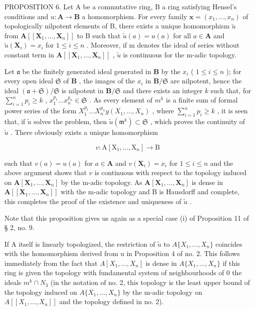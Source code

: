 PROPOSITION 6. Let A be a commutative ring, B a ring satisfying Hensel's conditions and \(u: \mathbf{A} \to \mathbf{B}\) a homomorphism. For every family \(\mathbf{x} = (x_1, \ldots, x_n)\) of topologically nilpotent elements of B, there exists a unique homomorphism \(\tilde{u}\) from \(\mathbf{A}[[\mathbf{X}_1, \ldots, \mathbf{X}_n]]\) to B such that \(\tilde{u}(a) = u(a)\) for all \(a \in \mathbf{A}\) and \(\tilde{u}(\mathbf{X}_i) = x_i\) for \(1 \leqslant i \leqslant n\) . Moreover, if m denotes the ideal of series without constant term in \(\mathbf{A}[[\mathbf{X}_1, \ldots, \mathbf{X}_n]]\) , \(\tilde{u}\) is continuous for the m-adic topology.

Let \(\mathfrak{a}\) be the finitely generated ideal generated in \(\mathbf{B}\) by the \(x_{i}\) ( \(1 \leqslant i \leqslant n\) ); for every open ideal \(\mathfrak{S}\) of \(\mathbf{B}\) , the images of the \(x_{i}\) in \(\mathbf{B}/\mathfrak{S}\) are nilpotent, hence the ideal \((\mathfrak{a} + \mathfrak{S})/\mathfrak{S}\) is nilpotent in \(\mathbf{B}/\mathfrak{S}\) and there exists an integer \(k\) such that, for \(\sum_{i=1}^{n} p_{i} \geqslant k\) , \(x_{1}^{p_{1}} \ldots x_{n}^{p_{n}} \in \mathfrak{S}\) . As every element of \(m^{k}\) is a finite sum of formal power series of the form \(X_{1}^{p_{1}} \ldots X_{n}^{p_{n}} g(X_{1}, \ldots, X_{n})\) , where \(\sum_{i=1}^{n} p_{i} \geqslant k\) , it is seen that, if \(\tilde{u}\) solves the problem, then \(\tilde{u}(\mathfrak{m}^k) \subset \mathfrak{S}\) , which proves the continuity of \(\tilde{u}\) . There obviously exists a unique homomorphism

\[
v \colon \mathrm{A} [ \mathrm{X} _ {1}, \dots , \mathrm{X} _ {n} ] \rightarrow \mathrm{B}
\]

such that \(v(a) = u(a)\) for \(a \in \mathbf{A}\) and \(v(\mathbf{X}_i) = x_i\) for \(1 \leqslant i \leqslant n\) and the above argument shows that \(v\) is continuous with respect to the topology induced on \(\mathbf{A}[\mathbf{X}_1, \ldots, \mathbf{X}_n]\) by the m-adic topology. As \(\mathbf{A}[\mathbf{X}_1, \ldots, \mathbf{X}_n]\) is dense in \(\mathbf{A}[[\mathbf{X}_1, \ldots, \mathbf{X}_n]]\) with the m-adic topology and B is Hausdorff and complete, this completes the proof of the existence and uniqueness of \(\tilde{u}\) .

Note that this proposition gives us again as a special case (i) of Proposition 11 of § 2, no. 9.

If A itself is linearly topologized, the restriction of \(\tilde{u}\) to \(A\{X_{1},\ldots,X_{n}\}\) coincides with the homomorphism derived from u in Proposition 4 of no. 2. This follows immediately from the fact that \(A[X_{1},\ldots,X_{n}]\) is dense in \(A\{X_{1},\ldots,X_{n}\}\) if this ring is given the topology with fundamental system of neighbourhoods of 0 the ideals \(m^{k}\cap N_{3}\) (in the notation of no. 2, this topology is the least upper bound of the topology induced on \(A\{X_{1},\ldots,X_{n}\}\) by the m-adic topology on \(A[[X_{1},\ldots,X_{n}]]\) and the topology defined in no. 2).

